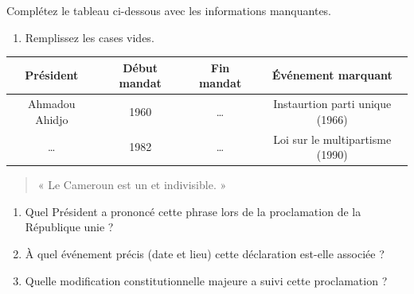 \documentclass[11pt]{article}
\begin{document}
\begin{exercice}
Complétez le tableau ci-dessous avec les informations manquantes.
\begin{enumerate}
    \item Remplissez les cases vides.
\end{enumerate}
\begin{center}
\begin{tabular}{|c|c|c|c|}
\hline
\textbf{Président} & \textbf{Début mandat} & \textbf{Fin mandat} & \textbf{Événement marquant} \\
\hline
Ahmadou Ahidjo & 1960 & \dots{} & Instaurtion parti unique (1966) \\
\hline
\dots{} & 1982 & \dots{} & Loi sur le multipartisme (1990) \\
\hline
\end{tabular}
\end{center}
\end{exercice}

\begin{exercice}
\begin{quote}
« Le Cameroun est un et indivisible. »
\end{quote}
\begin{enumerate}
    \item Quel Président a prononcé cette phrase lors de la proclamation de la République unie ?
    \item À quel événement précis (date et lieu) cette déclaration est-elle associée ?
    \item Quelle modification constitutionnelle majeure a suivi cette proclamation ?
\end{enumerate}
\end{exercice}
\end{document}
